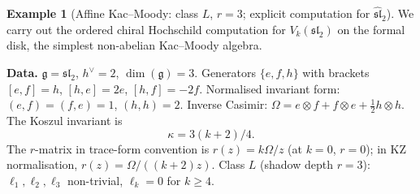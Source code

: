 \documentclass[11pt,reqno]{amsart}
\theoremstyle{definition}
\newtheorem{example}[theorem]{Example}
\theoremstyle{remark}
\newcommand{\fg}{\mathfrak{g}}
\numberwithin{equation}{section}
\begin{document}
\begin{example}[Affine Kac--Moody: class $L$, $r = 3$;
explicit computation for $\widehat{\mathfrak{sl}}_2$]
\label{ex:km}
We carry out the ordered chiral Hochschild computation for
$V_k(\mathfrak{sl}_2)$ on the formal disk, the simplest
non-abelian Kac--Moody algebra.

\smallskip
\noindent\textbf{Data.}
$\fg = \mathfrak{sl}_2$, $h^\vee = 2$, $\dim(\fg) = 3$.
Generators $\{e, f, h\}$ with brackets $[e,f] = h$,
$[h,e] = 2e$, $[h,f] = -2f$.
Normalised invariant form: $(e,f) = (f,e) = 1$,
$(h,h) = 2$. Inverse Casimir:
$\Omega = e \otimes f + f \otimes e
+ \tfrac{1}{2}h \otimes h$.
The Koszul invariant is
\begin{equation}\label{eq:sl2-kappa}
  \kappa = 3(k + 2)/4.
\end{equation}
The $r$-matrix in trace-form convention is
$r(z) = k\Omega/z$ (at $k = 0$, $r = 0$);
in KZ normalisation,
$r(z) = \Omega/((k + 2)z)$.
Class $L$ (shadow depth $r = 3$): $\ell_1, \ell_2, \ell_3$
non-trivial, $\ell_k = 0$ for $k \geq 4$.


\end{example}
\end{document}
